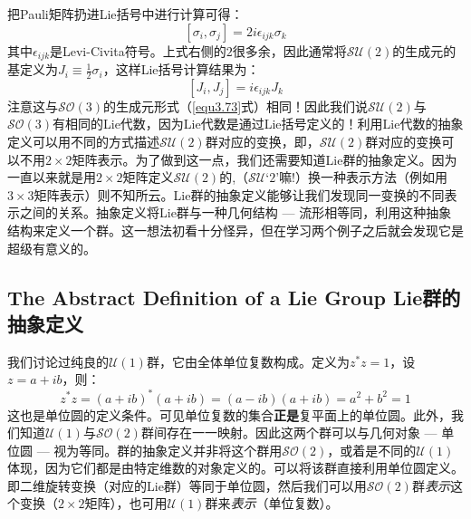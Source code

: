 把Pauli矩阵扔进Lie括号中进行计算可得：
\begin{equation}
\label{equ3.82}
[\sigma_i, \sigma_j] = 2i \epsilon_{ijk} \sigma_{k}
\end{equation}
其中$\epsilon_{ijk}$是Levi-Civita符号。上式右侧的$2$很多余，因此通常将$\mathcal{SU}(2)$的生成元的基定义为$J_i \equiv \frac{1}{2} \sigma_i$，这样Lie括号计算结果为：
\begin{equation}
\label{equ3.83}
[J_i, J_j] = i \epsilon_{ijk} J_k
\end{equation}
注意这与$\mathcal{SO}(3)$的生成元形式（\eqref{equ3.73}式）相同！因此我们说$\mathcal{SU}(2)$与$\mathcal{SO}(3)$有相同的Lie代数，因为Lie代数是通过Lie括号定义的！利用Lie代数的抽象定义可以用不同的方式描述$\mathcal{SU}(2)$群对应的变换，即，$\mathcal{SU}(2)$群对应的变换可以不用$2 \times 2$矩阵表示。为了做到这一点，我们还需要知道Lie群的抽象定义。因为一直以来就是用$2 \times 2$矩阵定义$\mathcal{SU}(2)$的,（$\mathcal{SU}$‘$2$’嘛!）换一种表示方法（例如用$3 \times 3$矩阵表示）则不知所云。Lie群的抽象定义能够让我们发现同一变换的不同表示之间的关系。抽象定义将Lie群与一种几何结构 --- 流形相等同，利用这种抽象结构来定义一个群。这一想法初看十分怪异，但在学习两个例子之后就会发现它是超级有意义的。


\subsection[Lie群的抽象定义]{The Abstract Definition of a Lie Group \quad Lie群的抽象定义}
\label{sec3.4.4}
我们讨论过纯良的$\mathcal{U}(1)$群，它由全体单位复数构成。定义为$z^* z = 1$，设$z = a + ib$，则：
\begin{equation}
\label{equ3.84}
z^* z = (a + ib)^* (a + ib) = (a - ib)(a + ib) = a^2 + b^2 = 1
\end{equation}
这也是单位圆的定义条件。可见单位复数的集合{\bf 正是}复平面上的单位圆。此外，我们知道$\mathcal{U}(1)$与$\mathcal{SO}(2)$群间存在一一映射。因此这两个群可以与几何对象 --- 单位圆 --- 视为等同。群的抽象定义并非将这个群用$\mathcal{SO}(2)$，或着是不同的$\mathcal{U}(1)$体现，因为它们都是由特定维数的对象定义的。可以将该群直接利用单位圆定义。即二维旋转变换（对应的Lie群）等同于单位圆，然后我们可以用$\mathcal{SO}(2)$群{\it 表示}这个变换（$2 \times 2$矩阵），也可用$\mathcal{U}(1)$群来{\it 表示}（单位复数）。

